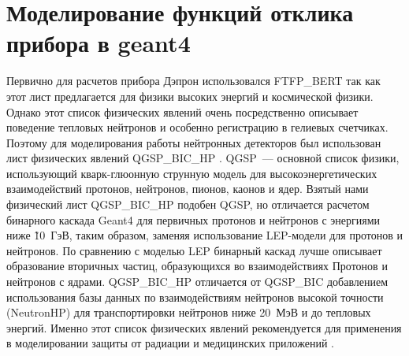 %					
%						


\section{Моделирование функций отклика прибора в geant4}

Первично для расчетов прибора Дэпрон использовался FTFP\_BERT так как этот лист предлагается для физики высоких энергий и космической физики. Однако этот список физических явлений очень посредственно описывает поведение тепловых нейтронов и особенно регистрацию в гелиевых счетчиках.
Поэтому для моделирования работы нейтронных детекторов был использован лист физических явлений QGSP\_BIC\_HP \cite{Wright2007}. QGSP~--- основной список физики, использующий кварк-глюонную струнную модель для высокоэнергетических взаимодействий протонов, нейтронов, пионов, каонов и ядер.  Взятый нами физический лист QGSP\_BIC\_HP подобен QGSP, но отличается расчетом бинарного каскада Geant4 для первичных протонов и нейтронов с энергиями ниже \~ 10~ГэВ, таким образом, заменяя использование LEP-модели для протонов и нейтронов. По сравнению с моделью LEP бинарный каскад лучше описывает образование вторичных частиц, образующихся во взаимодействиях Протонов и нейтронов с ядрами. QGSP\_BIC\_HP отличается от QGSP\_BIC добавлением использования базы данных по взаимодействиям нейтронов высокой точности (NeutronHP) для транспортировки нейтронов ниже 20~МэВ и до тепловых энергий. Именно этот список физических явлений рекомендуется для применения в моделировании защиты от радиации и медицинских приложений \cite{Wright2007}.

